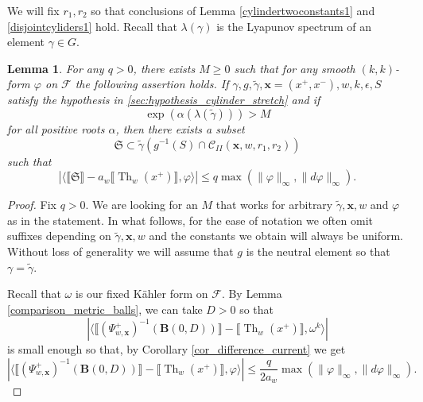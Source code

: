 \documentclass[12pt]{amsbook}%
\newtheorem{lem}[thm]{Lemma}
\theoremstyle{definition}
\theoremstyle{remark}
\numberwithin{section}{chapter}
\numberwithin{subsection}{section}
\numberwithin{figure}{chapter}
\DeclareMathOperator{\Th}{Th}
\DeclareMathOperator{\Opp}{Opp}
\def\eps{\epsilon}
\def\dyl{>0}
\def\cF{{\mathscr{F}}}
\def\fS{{\mathfrak{S}}}
\def\Oppxwd{{\operatorname{Opp}(x_{w^\vee})}}
\def\xpair{{(x^+,x^-)}}
\def\tga{{\tilde{\gamma}}}
\def\Cylii{{\mathcal{C}_{II}}}
\def\bx{\mathbf{x}}
\def\ga{\gamma}
\def\la{\lambda}
\begin{document}
{{We will fix $r_1,r_2$ so that conclusions of Lemma \ref{cylindertwoconstants1} and \ref{disjointcyliders1} hold. Recall that $\la(\ga)$ is the Lyapunov spectrum of an element $\ga\in G$. 
 
\begin{lem} \label{keylemma1}
For any $q>0$, there exists $M \geq 0$ such that for any smooth $(k,k)$-form $\varphi$ on $\cF$ the following assertion holds. If $\gamma,g,\tga,\bx=\xpair,w,k,\eps,S$ satisfy the hypothesis in \ref{sec:hypothesis_cylinder_stretch} and if 
\[
\exp\left(\alpha(\la(\tga))\right)>M
\]
for all positive roots $\alpha$, 
then there exists a subset
\[
\fS\subset \tga\left(g^{-1}(S)\cap \Cylii(\bx,w,r_1,r_2)\right)
\]
such that
\[ 
\left\lvert\langle \llbracket \fS\rrbracket  - a_w\llbracket \Th_{w}(x^+)\rrbracket , \varphi \rangle \right\rvert \leqslant q\max(  \lVert \varphi \rVert_{\infty}, \lVert d\varphi\rVert_\infty).
\]
\end{lem}


\begin{proof}
Fix $q>0$. We are looking for an $M$ that works for arbitrary $\tga,\bx,w$ and $\varphi$ as in the statement. In what follows, for the ease of notation we often omit suffixes depending on $\tga,\bx,w$ and the constants we obtain will always be uniform. Without loss of generality we will assume that $g$ is the neutral element so that $\gamma=\tga$.



Recall that $\omega$ is our fixed K\"ahler form on $\cF$. By Lemma \ref{comparison_metric_balls}, we can take $D\dyl$ so that 
\begin{equation}\label{eq:introduce_the_constant_D}
\left\lvert \langle \llbracket(\Psi_{w,\bx}^+)^{-1}(\mathbf{B}(0,D))\rrbracket - \llbracket \Th_w(x^+)\rrbracket, \omega^k\rangle\right \rvert
\end{equation}
is small enough so that, by Corollary \ref{cor_difference_current} we get
\begin{equation}\label{eq:ball_approximating_thickening}
\left\lvert \langle \llbracket(\Psi_{w,\bx}^+)^{-1}(\mathbf{B}(0,D))\rrbracket - \llbracket \Th_w(x^+)\rrbracket, \varphi\rangle\right \rvert \leqslant \frac{q}{2a_w}\max(  \lVert \varphi \rVert_{\infty}, \lVert d\varphi\rVert_\infty).
\end{equation}


\end{proof}}}
\end{document}
